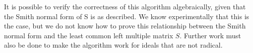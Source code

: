 \documentclass[12pt]{article}
\begin{document}
It is possible to verify the correctness of this algorithm algebraically, given that the Smith normal form of
S is as described. We know experimentally that this is the case, but we do not know how to prove this relationship
between the Smith normal form and the least common left multiple matrix $S$. Further work must also be done to
make the algorithm work for ideals that are not radical.
\end{document}
